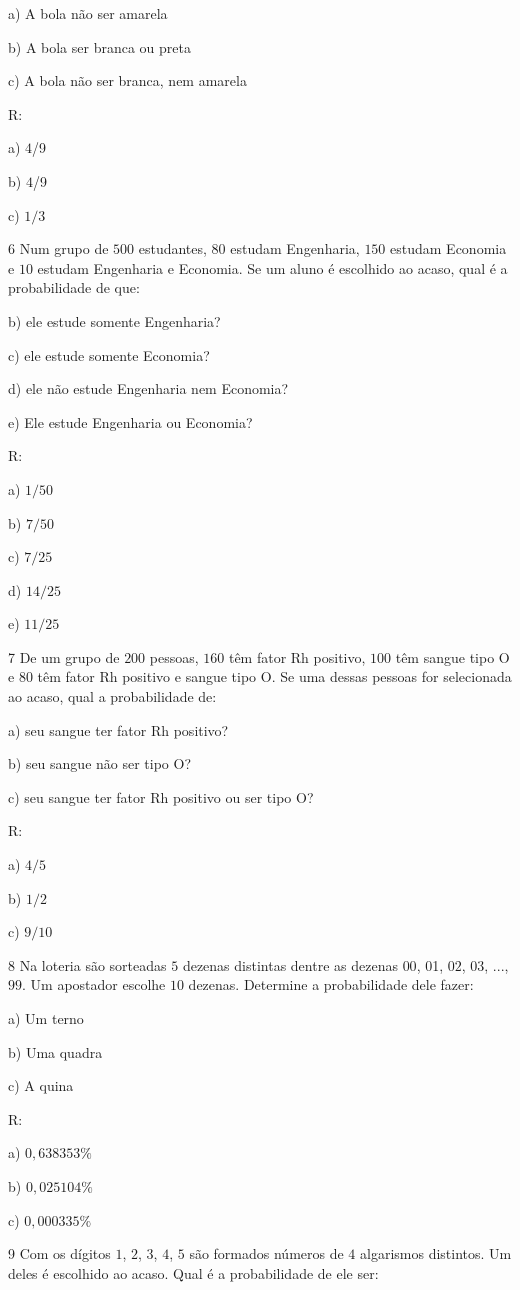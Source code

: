 a) A bola não ser amarela

b) A bola ser branca ou preta

c) A bola não ser branca, nem amarela

R:

a) $4$/9

b) $4$/9

c) $1/3$

\num{6}  Num grupo de $500$ estudantes, $80$ estudam Engenharia, $150$ estudam
Economia e $10$ estudam Engenharia e Economia. Se um aluno é escolhido ao
acaso, qual é a probabilidade de que:

b) ele estude somente Engenharia?

c) ele estude somente Economia?

d) ele não estude Engenharia nem Economia?

e) Ele estude Engenharia ou Economia?

R:

a) $1/50$

b) $7/50$

c) $7/25$

d) $14/25$

e) $11/25$

\num{7}  De um grupo de $200$ pessoas, $160$ têm fator Rh positivo, $100$ têm sangue
tipo O e $80$ têm fator Rh positivo e sangue tipo O. Se uma dessas pessoas
for selecionada ao acaso, qual a probabilidade de:

a) seu sangue ter fator Rh positivo?

b) seu sangue não ser tipo O?

c) seu sangue ter fator Rh positivo ou ser tipo O?

R:

a) $4/5$

b) $1/2$

c) $9/10$

\num{8}  Na loteria são sorteadas $5$ dezenas distintas dentre as dezenas $00$,
01, $02$, $03$, ..., $99$. Um apostador escolhe $10$ dezenas. Determine a
probabilidade dele fazer:

a) Um terno

b) Uma quadra

c) A quina

R:

a) $0,638353\%$

b) $0,025104\%$

c) $0,000335\%$

\num{9}  Com os dígitos $1$, $2$, $3$, $4$, $5$ são formados números de $4$ algarismos
distintos. Um deles é escolhido ao acaso. Qual é a probabilidade de ele
ser:

